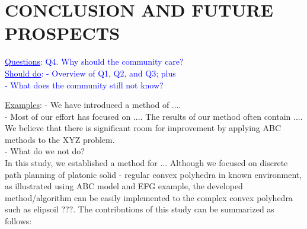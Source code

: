 
\section{CONCLUSION AND FUTURE PROSPECTS}
\textcolor{blue}{
\uline{Questions}: Q4. Why should the community care?\\
\noindent\uline{Should do}: 
- Overview of Q1, Q2, and Q3; plus\\
- What does the community still not know?\\
}

\noindent\uline{Examples}:
- We have introduced a method of ....\\
- Most of our effort has focused on .... The results of our method often contain .... We believe that there is significant room for improvement by applying ABC methods to the XYZ problem.\\
- What do we not do?\\

In this study, we established a method for ... Although we focused on discrete path planning of platonic solid - regular convex polyhedra in known environment, as illustrated using ABC model and EFG example, the developed method/algorithm can be easily implemented to the complex convex polyhedra such as elipsoil ???. The contributions of this study can be summarized as follows:\\


